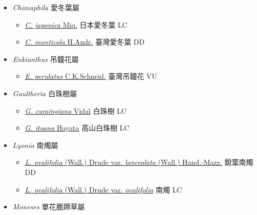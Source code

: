 
  \begin{itemize}
 \item[] \textit{Chimaphila} 愛冬葉屬
                                
  \begin{itemize}
        \item[] \href{http://www.theplantlist.org/tpl1.1/search?q=Chimaphila+japonica}{\textit{C. japonica} Miq.}   日本愛冬葉   LC
        \item[] \href{http://www.theplantlist.org/tpl1.1/search?q=Chimaphila+monticola}{\textit{C. monticola} H.Andr.}   臺灣愛冬葉   DD
  \end{itemize}
 \item[] \textit{Enkianthus} 吊鐘花屬
                                
  \begin{itemize}
        \item[] \href{http://www.theplantlist.org/tpl1.1/search?q=Enkianthus+perulatus}{\textit{E. perulatus} C.K.Schneid.}   臺灣吊鐘花   VU
  \end{itemize}
 \item[] \textit{Gaultheria} 白珠樹屬
                                
  \begin{itemize}
        \item[] \href{http://www.theplantlist.org/tpl1.1/search?q=Gaultheria+cumingiana}{\textit{G. cumingiana} Vidal}   白珠樹   LC
        \item[] \href{http://www.theplantlist.org/tpl1.1/search?q=Gaultheria+itoana}{\textit{G. itoana} Hayata}   高山白珠樹   LC
  \end{itemize}
 \item[] \textit{Lyonia} 南燭屬
                                
  \begin{itemize}
        \item[] \href{http://www.theplantlist.org/tpl1.1/search?q=Lyonia+ovalifolia+var.+lanceolata}{\textit{L. ovalifolia} (Wall.) Drude var. \textit{lanceolata} (Wall.) Hand.-Mazz.}   銳葉南燭   DD
        \item[] \href{http://www.theplantlist.org/tpl1.1/search?q=Lyonia+ovalifolia+var.+ovalifolia}{\textit{L. ovalifolia} (Wall.) Drude var. \textit{ovalifolia}}   南燭   LC
  \end{itemize}
 \item[] \textit{Moneses} 單花鹿蹄草屬
                                

\end{itemize}

